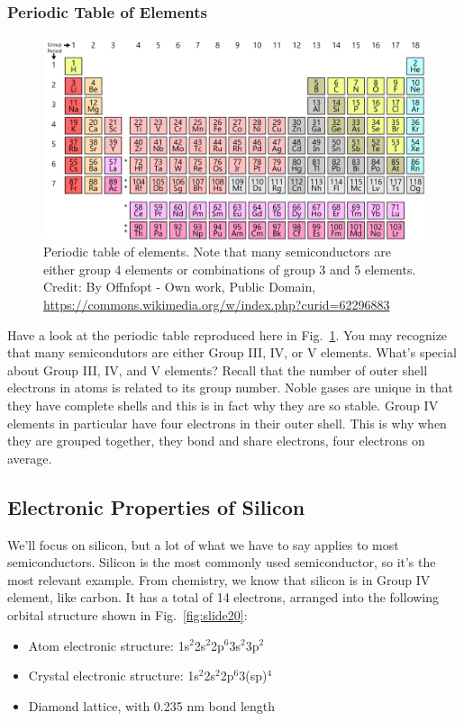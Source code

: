 \subsubsection{Periodic Table of Elements}
\begin{figure}
\begin{center}
\includegraphics[width=\columnwidth]{periodic_table}
\end{center}
\caption{Periodic table of elements.  Note that many semiconductors are either group 4 elements or combinations of group 3 and 5 elements. Credit:  By Offnfopt - Own work, Public Domain, \url{https://commons.wikimedia.org/w/index.php?curid=62296883 }}
\label{fig:periodic_table}
\end{figure}

Have a look at the periodic table reproduced here in Fig.~\ref{fig:periodic_table}.  You may recognize that many semicondutors are either Group III, IV, or V elements.   What's special about Group III, IV, and V elements?  Recall that the number of outer shell electrons in atoms is related to its group number.  Noble gases are unique in that they have complete shells and this is in fact why they are so stable.  Group IV elements in particular have four electrons in their outer shell.  This is why when they are grouped together, they bond and share electrons, four electrons on average.
\subsection{Electronic Properties of Silicon}
We'll focus on silicon, but a lot of what we have to say applies to most semiconductors.  Silicon is the most commonly used semiconductor, so it's the most relevant example.  From chemistry, we know that silicon is in Group IV element, like carbon.  It has a total of 14 electrons, arranged into the following orbital structure shown in Fig.~\ref{fig:slide20}:
\begin{itemize}
\item   Atom electronic structure: 1s$^2$2s$^2$2p$^6$3s$^2$3p$^2$
\item   Crystal electronic structure: 1s$^2$2s$^2$2p$^6$3(sp)$^4$
\item   Diamond lattice, with 0.235 nm bond length
\end{itemize}
 
